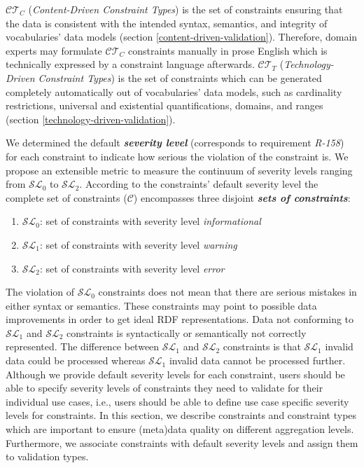 \documentclass{llncs}
\begin{document}
$\mathcal{CT}_{C}$ (\emph{Content-Driven Constraint Types}) is the set of constraints ensuring that the data is consistent with the intended syntax, semantics, and integrity of vocabularies' data models (section \ref{content-driven-validation}). 
Therefore, domain experts may formulate $\mathcal{CT}_{C}$ constraints manually in prose English which is technically expressed by a constraint language afterwards.  
$\mathcal{CT}_{T}$ (\emph{Technology-Driven Constraint Types}) is the set of constraints which can be generated completely automatically out of vocabularies' data models, such as cardinality restrictions, universal and existential quantifications, domains, and ranges (section \ref{technology-driven-validation}).

We determined the default \textbf{\emph{severity level}} (corresponds to requirement \emph{R-158}) for each constraint to indicate how serious the violation of the constraint is.
We propose an extensible metric to measure the continuum of severity levels ranging from $\mathcal{SL}_{0}$ to $\mathcal{SL}_{2}$.
According to the constraints' default severity level the complete set of constraints ($\mathcal{C}$) encompasses three disjoint \textbf{\emph{sets of constraints}}:
\begin{enumerate}
	\item $\mathcal{SL}_{0}$: set of constraints with severity level \emph{informational}
	\item $\mathcal{SL}_{1}$: set of constraints with severity level \emph{warning}
	\item $\mathcal{SL}_{2}$: set of constraints with severity level \emph{error}
\end{enumerate}
The violation of $\mathcal{SL}_{0}$ constraints does not mean that there are serious mistakes in either syntax or semantics. These constraints may point to possible data improvements in order to get ideal RDF representations. 
Data not conforming to $\mathcal{SL}_{1}$ and $\mathcal{SL}_{2}$ constraints is syntactically or semantically not correctly represented.
The difference between $\mathcal{SL}_{1}$ and $\mathcal{SL}_{2}$ constraints is that $\mathcal{SL}_{1}$ invalid data could be processed 
whereas $\mathcal{SL}_{1}$ invalid data cannot be processed further. 
Although we provide default severity levels for each constraint, users should be able to specify severity levels of constraints they need to validate for their individual use cases, i.e., users should be able to define use case specific severity levels for constraints.
In this section, we describe constraints and constraint types which are important to ensure (meta)data  quality on different aggregation levels. 
Furthermore, we associate constraints with default severity levels and assign them to validation types. 
\end{document}
